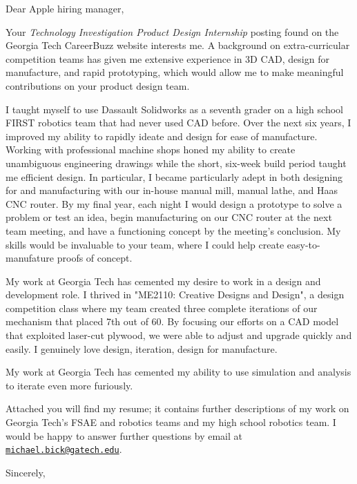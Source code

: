 \documentclass[12pt]{cover_letter}
\begin{document}
  \begin{letter}{}

    \opening{Dear Apple hiring manager,}

    \thispagestyle{fancy}

    Your \textit{Technology Investigation Product Design Internship} posting found on the Georgia Tech CareerBuzz website interests me. A background on extra-curricular competition teams has given me extensive experience in 3D CAD, design for manufacture, and rapid prototyping, which would allow me to make meaningful contributions on your product design team.

    I taught myself to use Dassault Solidworks as a seventh grader on a high school FIRST robotics team that had never used CAD before. Over the next six years, I improved my ability to rapidly ideate and design for ease of manufacture. Working with professional machine shops honed my ability to create unambiguous engineering drawings while the short, six-week build period taught me efficient design. In particular,  I became particularly adept in both designing for and manufacturing with our in-house manual mill, manual lathe, and Haas CNC router. By my final year, each night I would design a prototype to solve a problem or test an idea, begin manufacturing on our CNC router at the next team meeting, and have a functioning concept by the meeting's conclusion. My skills would be invaluable to your team, where I could help create easy-to-manufature proofs of concept.

    My work at Georgia Tech has cemented my desire to work in a design and development role. I thrived in "ME2110: Creative Designs and Design", a design competition class where my team created three complete iterations of our mechanism that placed 7th out of 60. By focusing our efforts on a CAD model that exploited laser-cut plywood, we were able to adjust and upgrade quickly and easily. I genuinely love design, iteration, design for manufacture.

    My work at Georgia Tech has cemented my ability to use simulation and analysis to iterate even more furiously.

    Attached you will find my resume; it contains further descriptions of my work on Georgia Tech's FSAE and robotics teams and my high school robotics team. I would be happy to answer further questions by email at \href{mailto:michael.bick@gatech.edu}{\nolinkurl{michael.bick@gatech.edu}}.

    \closing{Sincerely,}

  \end{letter}

  
\end{document}
